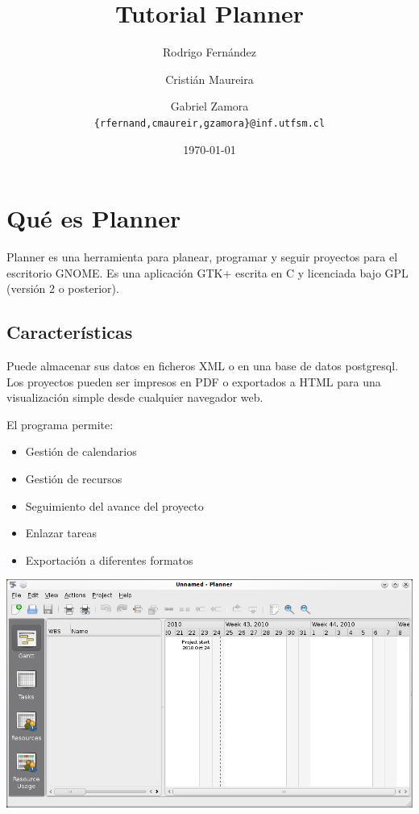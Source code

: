 \documentclass[letter, 10pt]{article}
\begin{document}
\title{Tutorial Planner}
\author{Rodrigo Fernández \and Cristián Maureira \and Gabriel Zamora\\ \small{\texttt{\{rfernand,cmaureir,gzamora\}@inf.utfsm.cl}}}
\date{\today}

\maketitle

\section{Qué es Planner}
Planner es una herramienta para planear, programar y seguir proyectos para el
escritorio GNOME. Es una aplicación GTK+ escrita en C y licenciada bajo GPL
(versión 2 o posterior).
\subsection{Características}
Puede almacenar sus datos en ficheros XML o en una base de datos
postgresql. Los proyectos pueden ser impresos en PDF o exportados a HTML para
una visualización simple desde cualquier navegador web.

El programa permite:
\begin{itemize}
    \item Gestión de calendarios
    \item Gestión de recursos
    \item Seguimiento del avance del proyecto
    \item Enlazar tareas
    \item Exportación a diferentes formatos
\end{itemize}
\includegraphics[scale=0.6]{img/planner_1}\\
\end{document}
